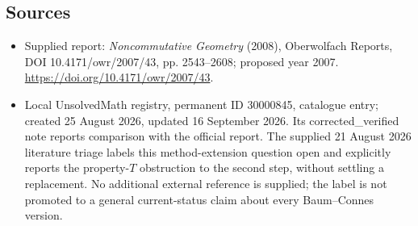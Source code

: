 \documentclass[11pt]{article}
\begin{document}
\subsection{Sources}
\begin{itemize}
\item Supplied report: \emph{Noncommutative Geometry} (2008), Oberwolfach Reports, DOI 10.4171/owr/2007/43, pp. 2543--2608; proposed year 2007. \url{https://doi.org/10.4171/owr/2007/43}.
\item Local UnsolvedMath registry, permanent ID 30000845, catalogue entry; created 25 August 2026, updated 16 September 2026. Its corrected\_verified note reports comparison with the official report. The supplied 21 August 2026 literature triage labels this method-extension question open and explicitly reports the property-$T$ obstruction to the second step, without settling a replacement. No additional external reference is supplied; the label is not promoted to a general current-status claim about every Baum--Connes version.
\end{itemize}
\end{document}
